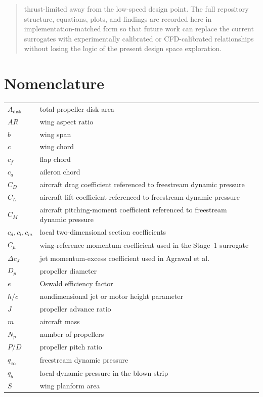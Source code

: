\documentclass[conf]{new-aiaa}
\begin{document}
\begin{abstract}
thrust-limited away from the low-speed design point. The full repository structure, equations, plots, and findings are recorded here in implementation-matched form so that future work can replace the current surrogates with experimentally calibrated or CFD-calibrated relationships without losing the logic of the present design space exploration.
\end{abstract}

\section*{Nomenclature}
\begin{longtable*}{@{}ll@{}}
\(A_{\mathrm{disk}}\) & total propeller disk area \\
\(AR\) & wing aspect ratio \\
\(b\) & wing span \\
\(c\) & wing chord \\
\(c_f\) & flap chord \\
\(c_a\) & aileron chord \\
\(C_D\) & aircraft drag coefficient referenced to freestream dynamic pressure \\
\(C_L\) & aircraft lift coefficient referenced to freestream dynamic pressure \\
\(C_M\) & aircraft pitching-moment coefficient referenced to freestream dynamic pressure \\
\(c_d, c_l, c_m\) & local two-dimensional section coefficients \\
\(C_\mu\) & wing-reference momentum coefficient used in the Stage~1 surrogate \\
\(\Delta c_J\) & jet momentum-excess coefficient used in Agrawal et al. \\
\(D_p\) & propeller diameter \\
\(e\) & Oswald efficiency factor \\
\(h/c\) & nondimensional jet or motor height parameter \\
\(J\) & propeller advance ratio \\
\(m\) & aircraft mass \\
\(N_p\) & number of propellers \\
\(P/D\) & propeller pitch ratio \\
\(q_\infty\) & freestream dynamic pressure \\
\(q_b\) & local dynamic pressure in the blown strip \\
\(S\) & wing planform area \\

\end{longtable*}
\end{document}
